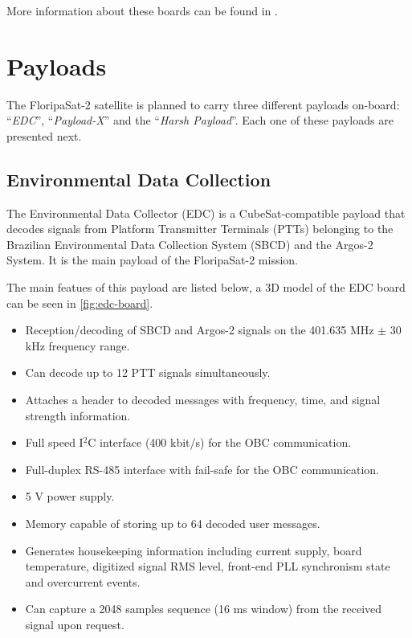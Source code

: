 More information about these boards can be found in \cite{iip}.

\section{Payloads}

The FloripaSat-2 satellite is planned to carry three different payloads on-board: ``\textit{EDC}'', ``\textit{Payload-X}'' and the ``\textit{Harsh Payload}''. Each one of these payloads are presented next.

\subsection{Environmental Data Collection}

The Environmental Data Collector (EDC) is a CubeSat-compatible payload that decodes signals from Platform Transmitter Terminals (PTTs) belonging to the Brazilian Environmental Data Collection System (SBCD) and the Argos-2 System. It is the main payload of the FloripaSat-2 mission.

The main featues of this payload are listed below, a 3D model of the EDC board can be seen in \autoref{fig:edc-board}.

\begin{itemize}
    \item Reception/decoding of SBCD and Argos-2 signals on the 401.635 MHz $\pm$ 30 kHz frequency range.
    \item Can decode up to 12 PTT signals simultaneously.
    \item Attaches a header to decoded messages with frequency, time, and signal strength information.
    \item Full speed I$^{2}$C interface (400 kbit/s) for the OBC communication.
    \item Full-duplex RS-485 interface with fail-safe for the OBC communication.
    \item 5 V power supply.
    \item Memory capable of storing up to 64 decoded user messages.
    \item Generates housekeeping information including current supply, board temperature, digitized signal RMS level, front-end PLL synchronism state and overcurrent events.
    \item Can capture a 2048 samples sequence (16 ms window) from the received signal upon request.
\end{itemize}

